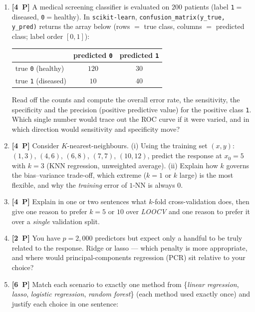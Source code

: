 \documentclass[11pt,a4paper]{article}
\newcommand{\pp}[1]{\textbf{[#1~P]}\enspace}
\begin{document}
\begin{enumerate}[label=(\alph*),leftmargin=7mm,itemsep=2.5mm]
  \item \pp{4} A medical screening classifier is evaluated on $200$ patients (label
    \texttt{1}$=$diseased, \texttt{0}$=$healthy). In \texttt{scikit-learn},
    \texttt{confusion\_matrix(y\_true, y\_pred)} returns the array below (rows $=$ true class,
    columns $=$ predicted class; label order $[0,1]$):
    \begin{center}
    \begin{tabular}{lcc}
    \toprule
     & predicted \texttt{0} & predicted \texttt{1}\\
    \midrule
    true \texttt{0} (healthy)  & $120$ & $30$\\
    true \texttt{1} (diseased) & $10$  & $40$\\
    \bottomrule
    \end{tabular}
    \end{center}
    Read off the counts and compute the overall error rate, the sensitivity, the specificity and
    the precision (positive predictive value) for the positive class \texttt{1}. Which single
    number would trace out the ROC curve if it were varied, and in which direction would
    sensitivity and specificity move?
  \item \pp{4} Consider $K$-nearest-neighbours. (i) Using the training set
    $(x,y)$: $(1,3)$, $(4,6)$, $(6,8)$, $(7,7)$, $(10,12)$, predict the response at $x_0=5$ with $k=3$
    (KNN regression, unweighted average). (ii) Explain how $k$ governs the bias--variance
    trade-off, which extreme ($k=1$ or $k$ large) is the most flexible, and why the
    \emph{training} error of $1$-NN is always $0$.
  \item \pp{4} Explain in one or two sentences what $k$-fold cross-validation does, then give
    one reason to prefer $k=5$ or $10$ over \emph{LOOCV} and one reason to prefer it over a
    \emph{single} validation split.
  \item \pp{2} You have $p=2{,}000$ predictors but expect only a handful to be truly related to
    the response. Ridge or lasso --- which penalty is more appropriate, and where would
    principal-components regression (PCR) sit relative to your choice?
  \item \pp{6} Match each scenario to exactly one method from
    \{\emph{linear regression}, \emph{lasso}, \emph{logistic regression},
    \emph{random forest}\} (each method used exactly once) and justify each choice in one
    sentence:

\end{enumerate}
\end{document}
